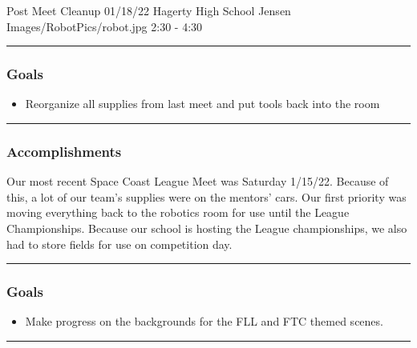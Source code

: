 \insertmeeting 
  {Post Meet Cleanup} 
  {01/18/22} 
  {Hagerty High School}
  {Jensen}
  {Images/RobotPics/robot.jpg}
  {2:30 - 4:30}
  
\noindent\hfil\rule{\textwidth}{.4pt}\hfil
\subsubsection*{Goals}
\begin{itemize}
    \item Reorganize all supplies from last meet and put tools back into the room

\end{itemize} 

\noindent\hfil\rule{\textwidth}{.4pt}\hfil

\subsubsection*{Accomplishments}
Our most recent Space Coast League Meet was Saturday 1/15/22. Because of this, a lot of our team's supplies were on the mentors' cars. Our first priority was moving everything back to the robotics room for use until the League Championships. Because our school is hosting the League championships, we also had to store fields for use on competition day. 



\noindent\hfil\rule{\textwidth}{.4pt}\hfil
\subsubsection*{Goals}
\begin{itemize}
    \item Make progress on the backgrounds for the FLL and FTC themed scenes.

\end{itemize} 

\noindent\hfil\rule{\textwidth}{.4pt}\hfil

